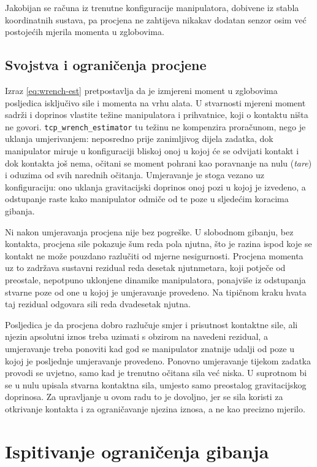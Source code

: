 Jakobijan se računa iz trenutne konfiguracije manipulatora, dobivene iz stabla koordinatnih
sustava, pa procjena ne zahtijeva nikakav dodatan senzor osim već postojećih mjerila momenta u
zglobovima.

\subsection{Svojstva i ograničenja procjene}
\label{sec:wrench-svojstva}

Izraz \eqref{eq:wrench-est} pretpostavlja da je izmjereni moment u zglobovima posljedica
isključivo sile i momenta na vrhu alata. U stvarnosti mjereni moment sadrži i doprinos
vlastite težine manipulatora i prihvatnice, koji o kontaktu ništa ne govori.
\texttt{tcp\_wrench\_estimator} tu težinu ne kompenzira proračunom, nego je uklanja umjerivanjem:
neposredno prije zanimljivog dijela zadatka, dok manipulator miruje u konfiguraciji bliskoj
onoj u kojoj će se odvijati kontakt i dok kontakta još nema, očitani se moment pohrani kao
poravnanje na nulu (\textit{tare}) i oduzima od svih narednih očitanja. Umjeravanje je stoga
vezano uz konfiguraciju: ono uklanja gravitacijski doprinos onoj pozi u kojoj je izvedeno, a
odstupanje raste kako manipulator odmiče od te poze u sljedećim koracima gibanja.

Ni nakon umjeravanja procjena nije bez pogreške. U slobodnom gibanju, bez kontakta, procjena
sile pokazuje šum reda pola njutna, što je razina ispod koje se kontakt ne može pouzdano
razlučiti od mjerne nesigurnosti. Procjena momenta uz to zadržava sustavni rezidual reda
desetak njutnmetara, koji potječe od preostale, nepotpuno uklonjene dinamike manipulatora,
ponajviše iz odstupanja stvarne poze od one u kojoj je umjeravanje provedeno. Na tipičnom kraku
hvata taj rezidual odgovara sili reda dvadesetak njutna.

Posljedica je da procjena dobro razlučuje smjer i prisutnost kontaktne sile, ali njezin
apsolutni iznos treba uzimati s obzirom na navedeni rezidual, a umjeravanje treba ponoviti
kad god se manipulator znatnije udalji od poze u kojoj je posljednje umjeravanje provedeno.
Ponovno umjeravanje tijekom zadatka provodi se uvjetno, samo kad je trenutno očitana sila već
niska. U suprotnom bi se u nulu upisala stvarna kontaktna sila, umjesto samo preostalog
gravitacijskog doprinosa. Za upravljanje u ovom radu to je dovoljno, jer se sila koristi za
otkrivanje kontakta i za ograničavanje njezina iznosa, a ne kao precizno mjerilo.

\section{Ispitivanje ograničenja gibanja}
\label{sec:constraint}


